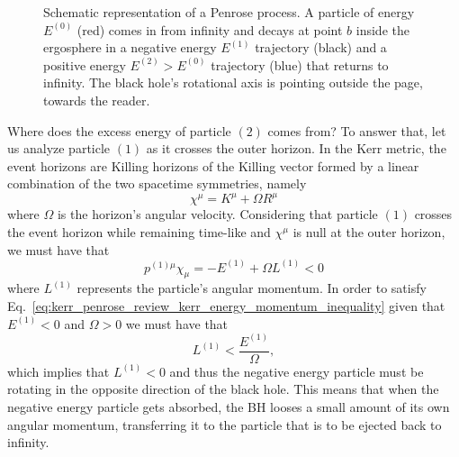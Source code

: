 \begin{figure}[!ht]
  \centering
  
  \caption{Schematic representation of a Penrose process. A particle of energy $E^{(0)}$ (red) comes in from infinity and decays at point $b$ inside the ergosphere in a negative energy $E^{(1)}$ trajectory (black) and a positive energy $E^{(2)}>E^{(0)}$ trajectory (blue) that returns to infinity. The black hole's rotational axis is pointing outside the page, towards the reader.}
  \label{fig:kerr_penrose_review_kerr_breakup}
\end{figure}

Where does the excess energy of particle $(2)$ comes from? To answer that, let us analyze particle $(1)$ as it crosses the outer horizon. In the Kerr metric, the event horizons are Killing horizons of the Killing vector formed by a linear combination of the two spacetime symmetries, namely
%
\begin{equation}
  \chi^\mu = K^\mu + \Omega R^\mu
  \label{eq:kerr_penrose_review_kerr_killing_horizon}
\end{equation}
%
where $\Omega$ is the horizon's angular velocity. Considering that particle $(1)$ crosses the event horizon while remaining time-like and $\chi^\mu$ is null at the outer horizon, we must have that
%
\begin{equation}
  p^{(1)\mu}\chi_\mu = -E^{(1)} + \Omega L^{(1)} < 0
  \label{eq:kerr_penrose_review_kerr_energy_momentum_inequality}
\end{equation}
%
where $L^{(1)}$ represents the particle's angular momentum. In order to satisfy Eq.~\eqref{eq:kerr_penrose_review_kerr_energy_momentum_inequality} given that $E^{(1)} < 0$ and $\Omega > 0$ we must have that
%
\begin{equation}
  L^{(1)} < \frac{E^{(1)}}{\Omega},
  \label{eq:kerr_penrose_review_kerr_energy_momentum_inequality_L}
\end{equation}
%
which implies that $L^{(1)} < 0$ and thus the negative energy particle must be rotating in the opposite direction of the black hole. This means that when the negative energy particle gets absorbed, the BH looses a small amount of its own angular momentum, transferring it to the particle that is to be ejected back to infinity.

